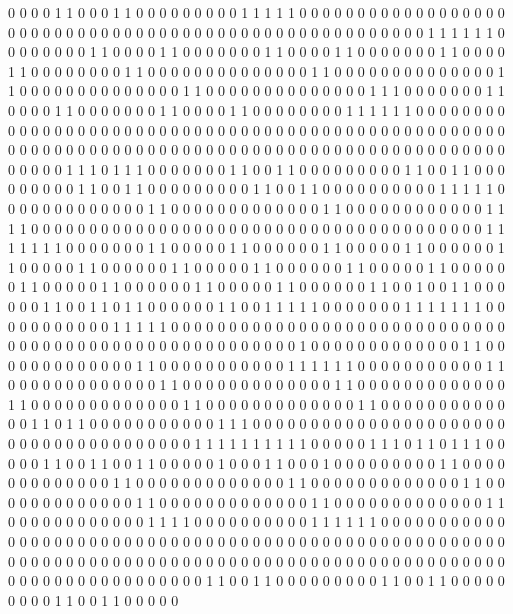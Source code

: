 0 0 0 0 1 1 0 0 0 1 1 0 0 0 0
0 0 0 0 0 1 1 1 1 1 0 0 0 0 0
0 0 0 0 0 0 0 0 0 0 0 0 0 0 0
0 0 0 0 0 0 0 0 0 0 0 0 0 0 0
0 0 0 0 0 0 0 0 0 0 0 0 0 0 0
0 0 0 0 1 1 1 1 1 1 0 0 0 0 0
0 0 0 1 1 0 0 0 0 1 1 0 0 0 0
0 0 0 1 1 0 0 0 0 1 1 0 0 0 0
0 0 0 1 1 0 0 0 0 1 1 0 0 0 0
0 0 0 0 1 1 0 0 0 0 0 0 0 0 0
0 0 0 0 0 1 1 0 0 0 0 0 0 0 0
0 0 0 0 0 0 1 1 0 0 0 0 0 0 0
0 0 0 0 0 0 0 1 1 0 0 0 0 0 0
0 0 0 0 0 0 0 0 1 1 1 0 0 0 0
0 0 0 1 1 0 0 0 0 1 1 0 0 0 0
0 0 0 1 1 0 0 0 0 1 1 0 0 0 0
0 0 0 0 1 1 1 1 1 1 0 0 0 0 0
0 0 0 0 0 0 0 0 0 0 0 0 0 0 0
0 0 0 0 0 0 0 0 0 0 0 0 0 0 0
0 0 0 0 0 0 0 0 0 0 0 0 0 0 0
0 0 0 0 0 0 0 0 0 0 0 0 0 0 0
0 0 0 0 0 0 0 0 0 0 0 0 0 0 0
0 0 0 0 0 0 0 0 0 0 0 0 0 0 0
0 0 0 0 1 1 1 0 1 1 1 0 0 0 0
0 0 0 1 1 0 0 1 1 0 0 0 0 0 0
0 0 0 1 1 0 0 1 1 0 0 0 0 0 0
0 0 0 1 1 0 0 1 1 0 0 0 0 0 0
0 0 0 1 1 0 0 1 1 0 0 0 0 0 0
0 0 0 0 1 1 1 1 1 0 0 0 0 0 0
0 0 0 0 0 0 0 1 1 0 0 0 0 0 0
0 0 0 0 0 0 0 1 1 0 0 0 0 0 0
0 0 0 0 0 0 1 1 1 1 0 0 0 0 0
0 0 0 0 0 0 0 0 0 0 0 0 0 0 0
0 0 0 0 0 0 0 0 0 0 0 0 0 0 0
0 0 0 0 1 1 1 1 1 1 1 0 0 0 0
0 0 0 1 1 0 0 0 0 0 1 1 0 0 0
0 0 0 1 1 0 0 0 0 0 1 1 0 0 0
0 0 0 1 1 0 0 0 0 0 1 1 0 0 0
0 0 0 1 1 0 0 0 0 0 1 1 0 0 0
0 0 0 1 1 0 0 0 0 0 1 1 0 0 0
0 0 0 1 1 0 0 0 0 0 1 1 0 0 0
0 0 0 1 1 0 0 0 0 0 1 1 0 0 0
0 0 0 1 1 0 0 1 0 0 1 1 0 0 0
0 0 0 1 1 0 0 1 1 0 1 1 0 0 0
0 0 0 1 1 0 0 1 1 1 1 1 0 0 0
0 0 0 0 1 1 1 1 1 1 1 0 0 0 0
0 0 0 0 0 0 0 1 1 1 1 1 0 0 0
0 0 0 0 0 0 0 0 0 0 0 0 0 0 0
0 0 0 0 0 0 0 0 0 0 0 0 0 0 0
0 0 0 0 0 0 0 0 0 0 0 0 0 0 0
0 0 0 0 0 0 1 0 0 0 0 0 0 0 0
0 0 0 0 0 1 1 0 0 0 0 0 0 0 0
0 0 0 0 0 1 1 0 0 0 0 0 0 0 0
0 0 0 1 1 1 1 1 1 0 0 0 0 0 0
0 0 0 0 0 1 1 0 0 0 0 0 0 0 0
0 0 0 0 0 1 1 0 0 0 0 0 0 0 0
0 0 0 0 0 1 1 0 0 0 0 0 0 0 0
0 0 0 0 0 1 1 0 0 0 0 0 0 0 0
0 0 0 0 0 1 1 0 0 0 0 0 0 0 0
0 0 0 0 0 1 1 0 0 0 0 0 0 0 0
0 0 0 0 0 1 1 0 1 1 0 0 0 0 0
0 0 0 0 0 0 1 1 1 0 0 0 0 0 0
0 0 0 0 0 0 0 0 0 0 0 0 0 0 0
0 0 0 0 0 0 0 0 0 0 0 0 0 0 0
0 0 1 1 1 1 1 1 1 1 1 1 0 0 0
0 0 1 1 1 0 1 1 0 1 1 1 0 0 0
0 0 1 1 0 0 1 1 0 0 1 1 0 0 0
0 0 1 0 0 0 1 1 0 0 0 1 0 0 0
0 0 0 0 0 0 1 1 0 0 0 0 0 0 0
0 0 0 0 0 0 1 1 0 0 0 0 0 0 0
0 0 0 0 0 0 1 1 0 0 0 0 0 0 0
0 0 0 0 0 0 1 1 0 0 0 0 0 0 0
0 0 0 0 0 0 1 1 0 0 0 0 0 0 0
0 0 0 0 0 0 1 1 0 0 0 0 0 0 0
0 0 0 0 0 0 1 1 0 0 0 0 0 0 0
0 0 0 0 0 1 1 1 1 0 0 0 0 0 0
0 0 0 0 1 1 1 1 1 1 0 0 0 0 0
0 0 0 0 0 0 0 0 0 0 0 0 0 0 0
0 0 0 0 0 0 0 0 0 0 0 0 0 0 0
0 0 0 0 0 0 0 0 0 0 0 0 0 0 0
0 0 0 0 0 0 0 0 0 0 0 0 0 0 0
0 0 0 0 0 0 0 0 0 0 0 0 0 0 0
0 0 0 0 0 0 0 0 0 0 0 0 0 0 0
0 0 0 0 0 0 0 0 0 0 0 0 0 0 0
0 0 0 0 1 1 0 0 1 1 0 0 0 0 0
0 0 0 0 1 1 0 0 1 1 0 0 0 0 0
0 0 0 0 1 1 0 0 1 1 0 0 0 0 0

